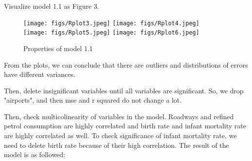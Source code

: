 Visualize model 1.1 as Figure 3.
\newpage
\begin{figure}[!htbp]
\centering 
        \texttt{[image: figs/Rplot3.jpeg]}
        \texttt{[image: figs/Rplot4.jpeg]} \\
        \texttt{[image: figs/Rplot5.jpeg]}
        \texttt{[image: figs/Rplot6.jpeg]}
\caption[Properties of model 1.1]{Properties of model 1.1}
\label{fig:example} 
\end{figure}
From the plots, we can conclude that there are outliers and distributions of errors have different variances.

Then, delete insignificant variables until all variables are significant. So, we drop "airports", and then mse and r squared do not change a lot.

Then, check multicolinearity of variables in the model. Roadways and refined petrol consumption are highly correlated and birth rate and infant mortality rate are highly correlated as well. To check significance of infant mortality rate, we need to delete birth rate because of their high correlation.
The result of the model is as followed:

